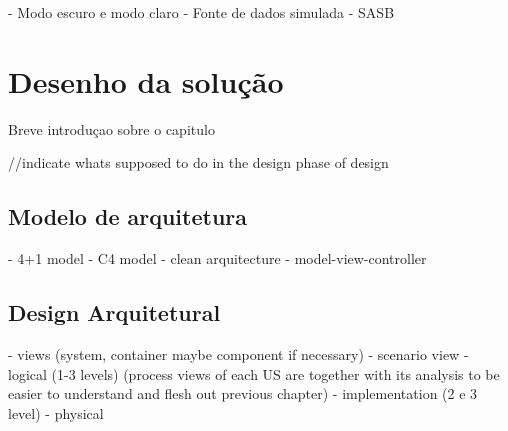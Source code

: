- Modo escuro e modo claro
- Fonte de dados simulada
- SASB


\chapter{Desenho da solução}
Breve introduçao sobre o capitulo

//indicate whats supposed to do in the design phase of design


\section{Modelo de arquitetura} 
- 4+1 model
- C4 model
- clean arquitecture
- model-view-controller

\section{Design Arquitetural} 
- views (system, container maybe component if necessary)
    - scenario view
    - logical (1-3 levels)
    (process views of each US are together with its analysis to be easier to understand and flesh out previous chapter)
    - implementation (2 e 3 level)
    - physical